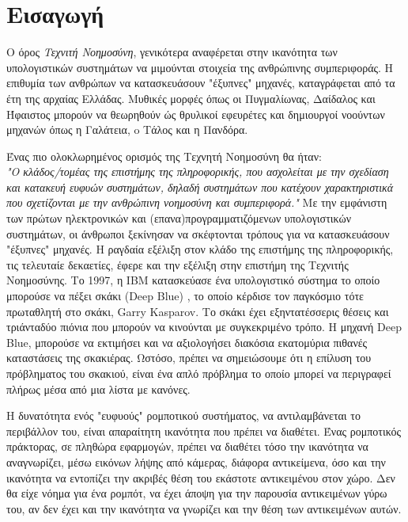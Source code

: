 \chapter{Εισαγωγή}
\label{chapter:intro}

Ο όρος \emph{Τεχνιτή Νοημοσύνη}, γενικότερα αναφέρεται στην ικανότητα των υπολογιστικών
συστημάτων να μιμούνται στοιχεία της ανθρώπινης συμπεριφοράς.
Η επιθυμία των ανθρώπων να κατασκευάσουν "έξυπνες" μηχανές, καταγράφεται από
τα έτη της αρχαίας Ελλάδας. Μυθικές μορφές όπως οι Πυγμαλίωνας, Δαίδαλος και
Ήφαιστος μπορούν να θεωρηθούν ώς θρυλικοί εφευρέτες και δημιουργοί νοούντων
μηχανών όπως η Γαλάτεια, o Τάλος και η Πανδόρα.

Ένας πιο ολοκλωρημένος ορισμός της Τεχνητή Νοημοσύνη θα ήταν: \\
\emph{
  "Ο κλάδος/τομέας της επιστήμης της πληροφορικής, που ασχολείται
  με την σχεδίαση και κατακευή ευφυών συστημάτων, δηλαδή συστημάτων που
  κατέχουν χαρακτηριστικά που σχετίζονται με την ανθρώπινη νοημοσύνη και συμπεριφορά."
}
Με την εμφάνιστη των πρώτων ηλεκτρονικών και (επανα)προγραμματιζόμενων υπολογιστικών συστημάτων,
οι άνθρωποι ξεκίνησαν να σκέφτονται τρόπους για να κατασκευάσουν "έξυπνες" μηχανές.
H ραγδαία εξέλιξη στον κλάδο της επιστήμης της πληροφορικής, τις τελευταίε
δεκαετίες, έφερε και την εξέλιξη στην επιστήμη της Τεχνιτής Νοημοσύνης.
Το 1997, η IBM κατασκεύασε ένα υπολογιστικό σύστημα το οποίο μπορούσε να
πέξει σκάκι (Deep Blue) \cite{campbell2002deep}, το οποίο κέρδισε τον παγκόσμιο
τότε πρωταθλητή στο σκάκι, Garry Kasparov. Το σκάκι έχει εξηντατέσσερις θέσεις
και τριάνταδύο πιόνια που μπορούν να κινούνται με συγκεκριμένο τρόπο. H μηχανή
Deep Blue, μπορούσε να εκτιμήσει και να αξιολογήσει διακόσια εκατομύρια
πιθανές καταστάσεις της σκακιέρας. Ωστόσο, πρέπει να σημειώσουμε ότι η επίλυση του
πρόβληματος του σκακιού, είναι ένα απλό πρόβλημα το οποίο μπορεί να περιγραφεί
πλήρως μέσα από μια λίστα με κανόνες.

Η δυνατότητα ενός "ευφυούς" ρομποτικού συστήματος, να αντιλαμβάνεται
το περιβάλλον του, είναι απαραίτητη ικανότητα που πρέπει να διαθέτει.
Ένας ρομποτικός πράκτορας, σε πληθώρα εφαρμογών, πρέπει να διαθέτει τόσο την
ικανότητα να αναγνωρίζει, μέσω εικόνων λήψης από κάμερας, διάφορα αντικείμενα,
όσο και την ικανότητα να εντοπίζει την ακριβές θέση του
εκάστοτε αντικειμένου στον χώρο. Δεν θα είχε νόημα για ένα ρομπότ, να έχει άποψη
για την παρουσία αντικειμένων γύρω του, αν δεν έχει και την ικανότητα να γνωρίζει
και την θέση των αντικειμένων αυτών.




